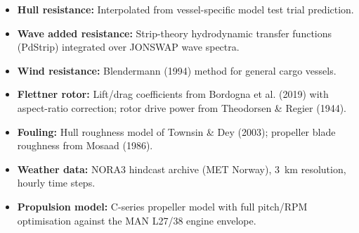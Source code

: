 \documentclass[a4paper,11pt]{article}
\begin{document}
\begin{itemize}
\item \textbf{Hull resistance:} Interpolated from vessel-specific model test trial
prediction.
\item \textbf{Wave added resistance:} Strip-theory hydrodynamic transfer functions
(PdStrip) integrated over JONSWAP wave spectra.
\item \textbf{Wind resistance:} Blendermann (1994) method for general cargo vessels.
\item \textbf{Flettner rotor:} Lift/drag coefficients from Bordogna et al. (2019) with
aspect-ratio correction; rotor drive power from Theodorsen \& Regier (1944).
\item \textbf{Fouling:} Hull roughness model of Townsin \& Dey (2003);
propeller blade roughness from Mosaad (1986).
\item \textbf{Weather data:} NORA3 hindcast archive (MET Norway), \SI{3}{\kilo\metre}
resolution, hourly time steps.
\item \textbf{Propulsion model:} C-series propeller model with full pitch/RPM optimisation
against the MAN L27/38 engine envelope.
\end{itemize}
\end{document}
